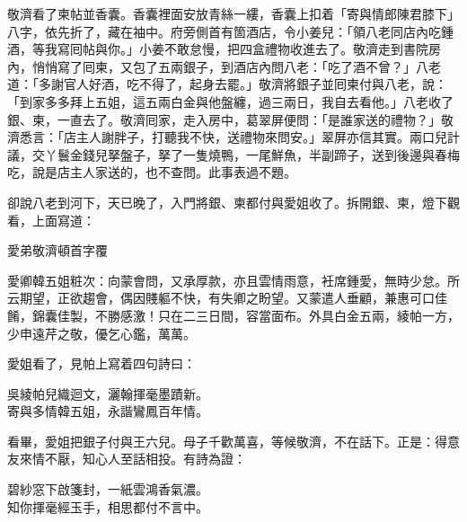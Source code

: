 敬濟看了柬帖並香囊。香囊裡面安放青絲一縷，香囊上扣着「寄與情郎陳君膝下」八字，{}依先折了，藏在袖中。府旁側首有箇酒店，令小姜兒：「領八老同店內吃鍾酒，等我寫囘帖與你。」小姜不敢怠慢，把四盒禮物收進去了。敬濟走到書院房內，悄悄寫了囘柬，又包了五兩銀子，到酒店內問八老：「吃了酒不曾？」八老道：「多謝官人好酒，吃不得了，起身去罷。」敬濟將銀子並囘柬付與八老，說：「到家多多拜上五姐，這五兩白金與他盤纏，過三兩日，我自去看他。」八老收了銀、柬，一直去了。敬濟囘家，走入房中，葛翠屏便問：「是誰家送的禮物？」敬濟悉言：「店主人謝胖子，打聽我不快，送禮物來問安。」翠屏亦信其實。兩口兒計議，交丫鬟金錢兒拏盤子，拏了一隻燒鴨，一尾鮮魚，半副蹄子，送到後邊與春梅吃，說是店主人家送的，也不查問。此事表過不題。

卻說八老到河下，天已晚了，入門將銀、柬都付與愛姐收了。拆開銀、柬，燈下觀看，上面寫道：

\begin{myquote}[\markfont]
愛弟敬濟頓首字覆

愛卿韓五姐粧次：向蒙會問，又承厚款，亦且雲情雨意，衽席鍾愛，無時少怠。所云期望，正欲趨會，偶因賤軀不快，有失卿之盼望。又蒙遣人垂顧，兼惠可口佳餚，錦囊佳製，不勝感激！只在二三日間，容當面布。外具白金五兩，綾帕一方，少申遠芹之敬，優乞心鑑，萬萬。

\end{myquote}

愛姐看了，見帕上寫着四句詩曰：

\begin{myquote}
吳綾帕兒織迴文，灑翰揮毫墨蹟新。\\寄與多情韓五姐，永諧鸞鳳百年情。
\end{myquote}

看畢，愛姐把銀子付與王六兒。母子千歡萬喜，等候敬濟，不在話下。正是：得意友來情不厭，知心人至話相投。有詩為證：

\begin{myquote}
碧紗窓下啟箋封，一紙雲鴻香氣濃。\\知你揮毫經玉手，相思都付不言中。
\end{myquote}

